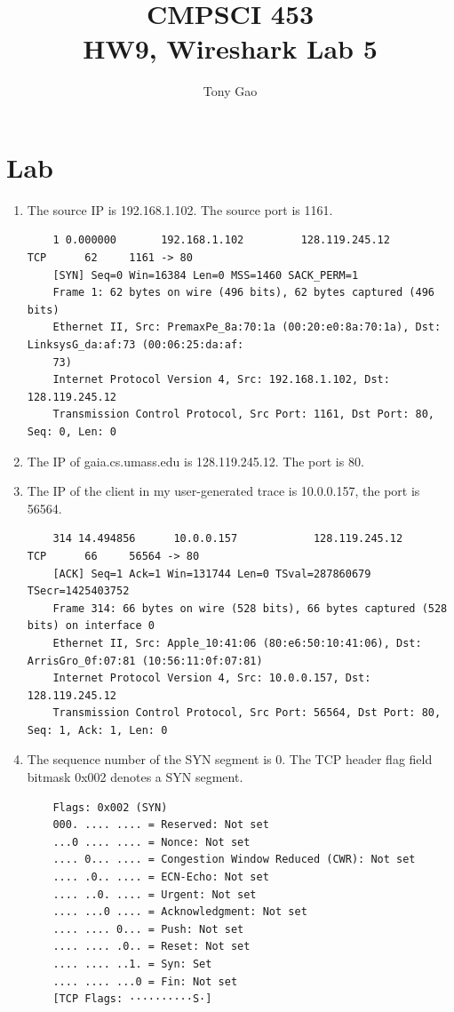 \documentclass[letter,10pt]{article}
\title{CMPSCI 453\\HW9, Wireshark Lab 5}
\author{Tony Gao}
\begin{document}
\maketitle


\section{Lab}

\begin{enumerate}	
	\item The source IP is 192.168.1.102. The source port is 1161.
	
	\begin{verbatim}
	1 0.000000       192.168.1.102         128.119.245.12        TCP      62     1161 -> 80
	[SYN] Seq=0 Win=16384 Len=0 MSS=1460 SACK_PERM=1
	Frame 1: 62 bytes on wire (496 bits), 62 bytes captured (496 bits)
	Ethernet II, Src: PremaxPe_8a:70:1a (00:20:e0:8a:70:1a), Dst: LinksysG_da:af:73 (00:06:25:da:af:
	73)
	Internet Protocol Version 4, Src: 192.168.1.102, Dst: 128.119.245.12
	Transmission Control Protocol, Src Port: 1161, Dst Port: 80, Seq: 0, Len: 0
	\end{verbatim}
	
	\item The IP of gaia.cs.umass.edu is 128.119.245.12. The port is 80.
	
	\item The IP of the client in my user-generated trace is 10.0.0.157, the port is 56564.
	
		\begin{verbatim}
	314 14.494856      10.0.0.157            128.119.245.12        TCP      66     56564 -> 80
	[ACK] Seq=1 Ack=1 Win=131744 Len=0 TSval=287860679 TSecr=1425403752
	Frame 314: 66 bytes on wire (528 bits), 66 bytes captured (528 bits) on interface 0
	Ethernet II, Src: Apple_10:41:06 (80:e6:50:10:41:06), Dst: ArrisGro_0f:07:81 (10:56:11:0f:07:81)
	Internet Protocol Version 4, Src: 10.0.0.157, Dst: 128.119.245.12
	Transmission Control Protocol, Src Port: 56564, Dst Port: 80, Seq: 1, Ack: 1, Len: 0
	\end{verbatim}
	
	\item The sequence number of the SYN segment is 0. The TCP header flag field bitmask 0x002 denotes a SYN segment.
	
	\begin{verbatim}
	Flags: 0x002 (SYN)
	000. .... .... = Reserved: Not set
	...0 .... .... = Nonce: Not set
	.... 0... .... = Congestion Window Reduced (CWR): Not set
	.... .0.. .... = ECN-Echo: Not set
	.... ..0. .... = Urgent: Not set
	.... ...0 .... = Acknowledgment: Not set
	.... .... 0... = Push: Not set
	.... .... .0.. = Reset: Not set
	.... .... ..1. = Syn: Set
	.... .... ...0 = Fin: Not set
	[TCP Flags: ··········S·]
	\end{verbatim}
	

\end{enumerate}
\end{document}
